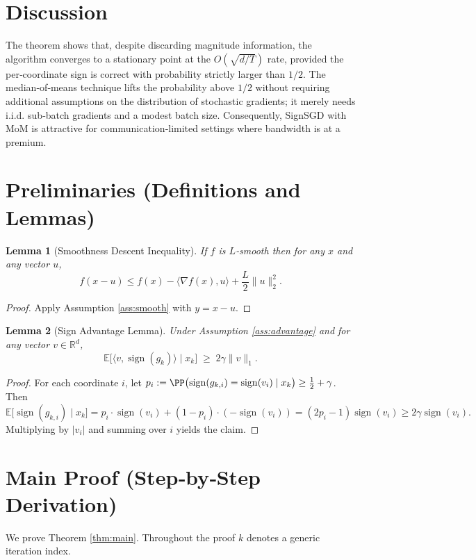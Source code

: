 \documentclass{article}
\newtheorem{lemma}{Lemma}
\newcommand{\sign}{\operatorname{sign}}
\newcommand{\EE}{\mathbb{E}}
\newcommand{\RR}{\mathbb{R}}
\begin{document}
\section*{Discussion}
The theorem shows that, despite discarding magnitude information, the algorithm converges to a stationary point at the $O(\sqrt{d/T})$ rate, provided the per‑coordinate sign is correct with probability strictly larger than $1/2$.  The median‑of‑means technique lifts the probability above $1/2$ without requiring additional assumptions on the distribution of stochastic gradients; it merely needs i.i.d. sub‑batch gradients and a modest batch size.  Consequently, SignSGD with MoM is attractive for communication‑limited settings where bandwidth is at a premium.

\newpage
\section*{Preliminaries (Definitions and Lemmas)}
\begin{lemma}[Smoothness Descent Inequality]\label{lem:smooth}
If $f$ is $L$‑smooth then for any $x$ and any vector $u$,
\[
f(x-u)\le f(x)-\langle\nabla f(x),u\rangle+\frac{L}{2}\|u\|_{2}^{2}.
\]
\end{lemma}
\begin{proof}
Apply Assumption \ref{ass:smooth} with $y = x-u$.
\end{proof}

\begin{lemma}[Sign Advantage Lemma]\label{lem:signadv}
Under Assumption \ref{ass:advantage} and for any vector $v\in\RR^{d}$,
\[
\EE\!\bigl[\langle v,\sign(g_{k})\rangle\mid x_{k}\bigr]\;\ge\;2\gamma\|v\|_{1}.
\]
\end{lemma}
\begin{proof}
For each coordinate $i$, let $p_{i}:=\PP\bigl(\sign(g_{k,i})=\sign(v_{i})\mid x_{k}\bigr)\ge\frac12+\gamma$.  
Then
\[
\EE\!\bigl[\sign(g_{k,i})\mid x_{k}\bigr]
= p_{i}\cdot\sign(v_{i})+(1-p_{i})\cdot(-\sign(v_{i}))
= (2p_{i}-1)\sign(v_{i})\ge 2\gamma\sign(v_{i}).
\]
Multiplying by $|v_{i}|$ and summing over $i$ yields the claim.
\end{proof}

\section*{Main Proof (Step‑by‑Step Derivation)}
We prove Theorem \ref{thm:main}.  Throughout the proof $k$ denotes a generic iteration index.
\end{document}
